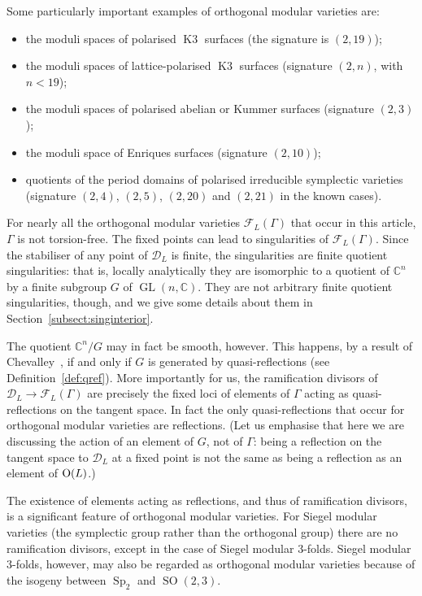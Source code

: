 \documentclass[a4paper,11pt]{article}
\newcommand{\CC}{\mathbb C}
\renewcommand{\cD}{\mathcal D}
\newcommand{\cF}{\mathcal F}
\newcommand{\GL}{\mathop{\mathrm {GL}}\nolimits}
\newcommand{\SO}{\mathop{\mathrm {SO}}\nolimits}
\newcommand{\Sp}{\mathop{\mathrm {Sp}}\nolimits}
\newcommand{\Orth}{\mathop{\null\mathrm {O}}\nolimits}
\newcommand{\Kthree}{\mathop{\mathrm {K3}}\nolimits}
\begin{document}
Some particularly important examples of orthogonal modular varieties are:
\begin{itemize}
\item[\rm{(a)}] the moduli spaces of polarised $\Kthree$ surfaces (the
  signature is $(2,19)$);
\item[\rm{(b)}] the moduli spaces of lattice-polarised $\Kthree$
  surfaces (signature $(2,n)$, with $n<19$);
\item[\rm{(c)}] the moduli spaces of polarised abelian or Kummer
  surfaces (signature $(2,3)$);
\item[\rm{(d)}] the moduli space of Enriques surfaces (signature
  $(2,10)$);
\item[\rm{(e)}] quotients of the period domains of polarised
  irreducible symplectic varieties (signature $(2,4)$,  $(2,5)$,
  $(2,20)$ and $(2,21)$ in the known cases).
\end{itemize}

For nearly all the orthogonal modular varieties $\cF_L(\Gamma)$ that
occur in this article, $\Gamma$ is not torsion-free. The fixed points
can lead to singularities of $\cF_L(\Gamma)$. Since the stabiliser of
any point of $\cD_L$ is finite, the singularities are finite quotient
singularities: that is, locally analytically they are isomorphic to a
quotient of $\CC^n$ by a finite subgroup $G$ of $\GL(n,\CC)$. They are
not arbitrary finite quotient singularities, though, and we give some
details about them in Section~\ref{subsect:singinterior}.

The quotient $\CC^n/G$ may in fact be smooth, however. This happens, by
a result of Chevalley~\cite{Che}, if
and only if $G$ is generated by quasi-reflections (see
Definition~\ref{def:qref}). More importantly for us, the ramification
divisors of $\cD_L\to\cF_L(\Gamma)$ are precisely the fixed loci of
elements of $\Gamma$ acting as quasi-reflections on the tangent
space. In fact the only quasi-reflections that occur for orthogonal
modular varieties are reflections. (Let us emphasise that here we are
discussing the action of an element of $G$, not of $\Gamma$: being a
reflection on the tangent space to $\cD_L$ at a fixed point is not the
same as being a reflection as an element of $\Orth(L)$.)

The existence of elements acting as reflections, and thus of
ramification divisors, is a significant feature of orthogonal modular
varieties. For Siegel modular varieties (the symplectic group rather
than the orthogonal group) there are no ramification divisors, except
in the case of Siegel modular $3$-folds. Siegel modular $3$-folds,
however, may also be regarded as orthogonal modular varieties because
of the isogeny between $\Sp_2$ and $\SO(2,3)$.
\end{document}
